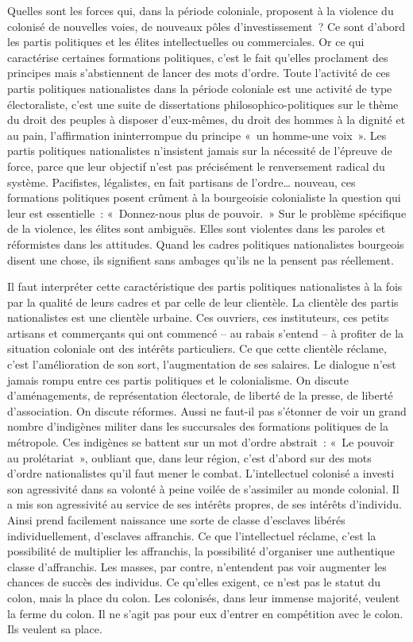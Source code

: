 \documentclass[french,twoside]{book} %
\begin{document}
\noindent Quelles sont les forces qui, dans la période coloniale, proposent à la violence du colonisé de nouvelles voies, de nouveaux pôles d’investissement ? Ce sont d’abord les partis politiques et les élites intellectuelles ou commerciales. Or ce qui caractérise certaines formations politiques, c’est le fait qu’elles proclament des principes mais s’abstiennent de lancer des mots d’ordre. Toute l’activité de ces partis politiques nationalistes dans la   période coloniale est une activité de type électoraliste, c’est une suite de dissertations philosophico-politiques sur le thème du droit des peuples à disposer d’eux-mêmes, du droit des hommes à la dignité et au pain, l’affirmation ininterrompue du principe « un homme-une voix ». Les partis politiques nationalistes n’insistent jamais sur la nécessité de l’épreuve de force, parce que leur objectif n’est pas précisément le renversement radical du système. Pacifistes, légalistes, en fait partisans de l’ordre… nouveau, ces formations politiques posent crûment à la bourgeoisie colonialiste la question qui leur est essentielle : « Donnez-nous plus de pouvoir. » Sur le problème spécifique de la violence, les élites sont ambiguës. Elles sont violentes dans les paroles et réformistes dans les attitudes. Quand les cadres politiques nationalistes bourgeois disent une chose, ils signifient sans ambages qu’ils ne la pensent pas réellement.\par
\bigbreak
\noindent Il faut interpréter cette caractéristique des partis politiques nationalistes à la fois par la qualité de leurs cadres et par celle de leur clientèle. La clientèle des partis nationalistes est une clientèle urbaine. Ces ouvriers, ces instituteurs, ces petits artisans et commerçants qui ont commencé – au rabais s’entend – à profiter de la situation coloniale ont des intérêts particuliers. Ce que cette clientèle réclame, c’est l’amélioration de son sort, l’augmentation de ses salaires. Le dialogue n’est jamais rompu entre ces partis politiques et le colonialisme. On discute d’aménagements, de représentation électorale, de liberté de la presse, de liberté d’association. On discute réformes. Aussi ne faut-il pas s’étonner de voir un grand nombre d’indigènes militer dans les succursales des formations politiques de la métropole. Ces indigènes se battent sur un mot d’ordre abstrait : « Le pouvoir au prolétariat », oubliant que, dans leur région, c’est d’abord sur des mots d’ordre nationalistes qu’il faut mener le combat. L’intellectuel colonisé a investi son agressivité dans sa volonté à peine voilée de s’assimiler au monde colonial. Il a mis son agressivité au service de ses intérêts propres, de ses intérêts d’individu. Ainsi prend facilement naissance une sorte de classe   d’esclaves libérés individuellement, d’esclaves affranchis. Ce que l’intellectuel réclame, c’est la possibilité de multiplier les affranchis, la possibilité d’organiser une authentique classe d’affranchis. Les masses, par contre, n’entendent pas voir augmenter les chances de succès des individus. Ce qu’elles exigent, ce n’est pas le statut du colon, mais la place du colon. Les colonisés, dans leur immense majorité, veulent la ferme du colon. Il ne s’agit pas pour eux d’entrer en compétition avec le colon. Ils veulent sa place.\par
\end{document}
